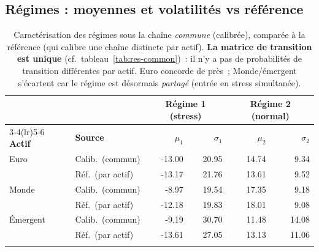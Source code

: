 \documentclass[11pt,a4paper]{article}
\theoremstyle{definition}
\begin{document}
\subsection{Régimes : moyennes et volatilités vs référence}
\begin{table}[H]\centering\small\renewcommand{\arraystretch}{1.2}\setlength{\tabcolsep}{5pt}
\begin{tabularx}{\textwidth}{@{}l X r r r r@{}}
\toprule
& & \multicolumn{2}{c}{\textbf{Régime 1 (stress)}} & \multicolumn{2}{c}{\textbf{Régime 2 (normal)}}\\
\cmidrule(lr){3-4}\cmidrule(lr){5-6}
\textbf{Actif} & \textbf{Source} & $\mu_1$ & $\sigma_1$ & $\mu_2$ & $\sigma_2$\\
\midrule
Euro & Calib.\ (commun) & -13.00 & 20.95 & 14.74 & 9.34\\
 & Réf.\ (par actif) & -13.17 & 21.76 & 13.61 & 9.52\\
\addlinespace
Monde & Calib.\ (commun) & -8.97 & 19.54 & 17.35 & 9.18\\
 & Réf.\ (par actif) & -12.18 & 19.83 & 18.01 & 9.08\\
\addlinespace
Émergent & Calib.\ (commun) & -9.19 & 30.70 & 11.48 & 14.08\\
 & Réf.\ (par actif) & -13.61 & 27.05 & 13.13 & 11.06\\
\addlinespace
\bottomrule\end{tabularx}
\caption{Caractérisation des régimes sous la chaîne \emph{commune} (calibrée), comparée à la référence (qui calibre une chaîne distincte par actif). \textbf{La matrice de transition est unique} (cf.\ tableau~\ref{tab:res-common})~: il n'y a pas de probabilités de transition différentes par actif. Euro concorde de près~; Monde/émergent s'écartent car le régime est désormais \emph{partagé} (entrée en stress simultanée).}\label{tab:res-rsln-sep}
\end{table}
\end{document}
